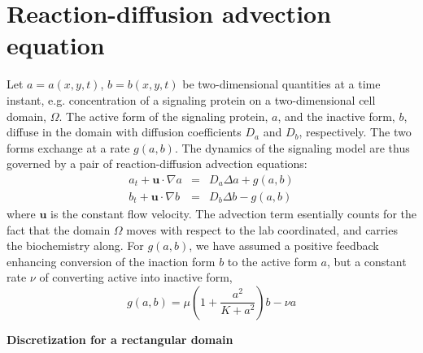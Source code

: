 \documentclass[11pt]{article}
\renewcommand{\vec}[1]{\bm{#1}}                 %
\begin{document}
\noindent

\section*{Reaction-diffusion advection equation}

Let $a = a(x,y,t)$, $b = b(x,y,t)$ be two-dimensional quantities at a time instant, e.g. concentration of a signaling protein on a two-dimensional cell domain, $\Omega$. The active form of the signaling protein, $a$, and the inactive form, $b$, diffuse in the domain with diffusion coefficients $D_a$ and $D_b$, respectively. The two forms exchange at a rate $g(a,b)$. The dynamics of the signaling model are thus governed by a pair of reaction-diffusion advection equations:
\begin{eqnarray}
a_t + \vec{u} \cdot \nabla{a} &=& D_a \Delta a + g(a,b) \\
b_t + \vec{u} \cdot \nabla{b} &=& D_b \Delta b - g(a,b) 
\end{eqnarray}
where $\vec{u}$ is the constant flow velocity. The advection term esentially counts for the fact that the domain $\Omega$ moves with respect to the lab coordinated, and carries the biochemistry along. For $g(a,b)$, we have assumed a positive feedback enhancing conversion of the inaction form $b$ to the active form $a$, but a constant rate $\nu$ of converting active into inactive form,
$$g(a,b)=\mu \left(1+\frac{a^2}{K+a^2}\right) b - \nu a$$

\noindent \textbf{Discretization for a rectangular domain}
\end{document}
